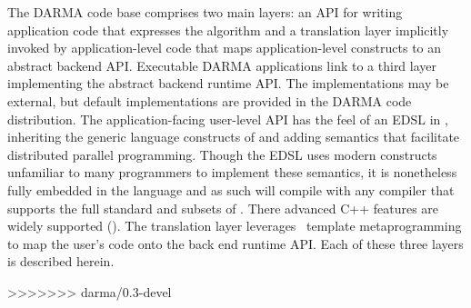 The DARMA code base comprises two main layers: 
an API for writing application code that expresses the algorithm and  
a translation layer implicitly invoked by application-level code that maps application-level constructs
to an abstract backend API.
Executable DARMA applications link to a third layer implementing the abstract backend runtime API.
The implementations may be external, but default implementations are provided in the DARMA code distribution.
The application-facing user-level \gls{API} has the feel of an \gls{EDSL} in \CC,  
inheriting the generic language constructs of \CC and adding \gls{semantics} that facilitate
distributed parallel programming.  
Though the \gls{EDSL} uses modern \CC constructs unfamiliar to many programmers to implement these semantics, 
it is nonetheless fully embedded in the \CC language and as such will compile with any
\CC compiler that supports the full  standard and subsets of .
There advanced C++ features are widely supported ().  
The \gls{translation layer} leverages \CC\ \gls{template
metaprogramming} to map the user's code onto the \gls{back end} runtime \gls{API}.
Each of these three layers is described herein.


>>>>>>> darma/0.3-devel
